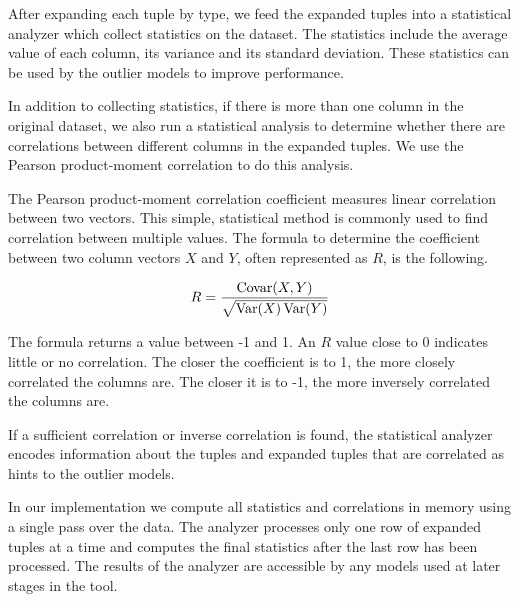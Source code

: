 
After expanding each tuple by type, we feed the expanded tuples into a statistical analyzer which collect statistics on the dataset.
The statistics include the average value of each column, its variance and its standard deviation.
These statistics can be used by the outlier models to improve performance.

In addition to collecting statistics, if there is more than one column in the original dataset, we also run a statistical analysis to determine whether there are correlations between different columns in the expanded tuples.
We use the Pearson product-moment correlation to do this analysis.

The Pearson product-moment correlation coefficient measures linear correlation between two vectors.
This simple, statistical method is commonly used to find correlation between multiple values.
The formula to determine the coefficient between two column vectors $X$ and $Y$, often represented as $R$, is the following.

$$
R = \frac{\operatorname{Covar}(X,Y)}{\sqrt{\operatorname{Var}(X)\operatorname{Var}(Y)}}
$$

The formula returns a value between -1 and 1.
An $R$ value close to 0 indicates little or no correlation.
The closer the coefficient is to 1, the more closely correlated the columns are.
The closer it is to -1, the more inversely correlated the columns are.

If a sufficient correlation or inverse correlation is found, the statistical analyzer encodes information about the tuples and expanded tuples that are correlated as hints to the outlier models.

In our implementation we compute all statistics and correlations in memory using a single pass over the data.
The analyzer processes only one row of expanded tuples at a time and computes the final statistics after the last row has been processed.
The results of the analyzer are accessible by any models used at later stages in the tool.

